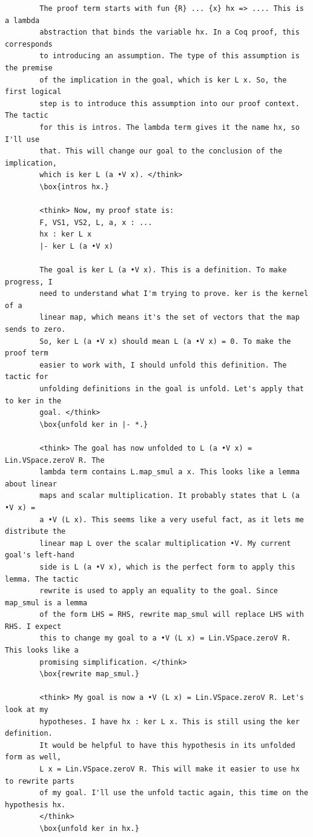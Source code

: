 \documentclass{article}
\theoremstyle{plain}
\theoremstyle{definition}
\theoremstyle{remark}
\begin{document}
        \begin{small}
	\begin{verbatim}
		The proof term starts with fun {R} ... {x} hx => .... This is a lambda
		abstraction that binds the variable hx. In a Coq proof, this corresponds
		to introducing an assumption. The type of this assumption is the premise
		of the implication in the goal, which is ker L x. So, the first logical
		step is to introduce this assumption into our proof context. The tactic
		for this is intros. The lambda term gives it the name hx, so I'll use
		that. This will change our goal to the conclusion of the implication,
		which is ker L (a •V x). </think>
		\box{intros hx.}
		
		<think> Now, my proof state is:
		F, VS1, VS2, L, a, x : ...
		hx : ker L x
		|- ker L (a •V x)
		
		The goal is ker L (a •V x). This is a definition. To make progress, I
		need to understand what I'm trying to prove. ker is the kernel of a
		linear map, which means it's the set of vectors that the map sends to zero.
		So, ker L (a •V x) should mean L (a •V x) = 0. To make the proof term
		easier to work with, I should unfold this definition. The tactic for
		unfolding definitions in the goal is unfold. Let's apply that to ker in the
		goal. </think>
		\box{unfold ker in |- *.}
		
		<think> The goal has now unfolded to L (a •V x) = Lin.VSpace.zeroV R. The
		lambda term contains L.map_smul a x. This looks like a lemma about linear
		maps and scalar multiplication. It probably states that L (a •V x) =
		a •V (L x). This seems like a very useful fact, as it lets me distribute the
		linear map L over the scalar multiplication •V. My current goal's left-hand
		side is L (a •V x), which is the perfect form to apply this lemma. The tactic
		rewrite is used to apply an equality to the goal. Since map_smul is a lemma
		of the form LHS = RHS, rewrite map_smul will replace LHS with RHS. I expect
		this to change my goal to a •V (L x) = Lin.VSpace.zeroV R. This looks like a
		promising simplification. </think>
		\box{rewrite map_smul.}
		
		<think> My goal is now a •V (L x) = Lin.VSpace.zeroV R. Let's look at my
		hypotheses. I have hx : ker L x. This is still using the ker definition.
		It would be helpful to have this hypothesis in its unfolded form as well,
		L x = Lin.VSpace.zeroV R. This will make it easier to use hx to rewrite parts
		of my goal. I'll use the unfold tactic again, this time on the hypothesis hx.
		</think>
		\box{unfold ker in hx.}
		

\end{verbatim}
\end{small}
\end{document}

